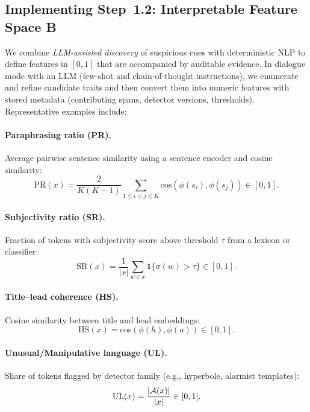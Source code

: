 \documentclass[ai,article,submit,pdftex,moreauthors]{Definitions/mdpi}
\begin{document}
\subsection{Implementing Step~1.2: Interpretable Feature Space B}\label{subsec:mlfeatures}
We combine \emph{LLM-assisted discovery} of suspicious cues with deterministic NLP to define features in $[0,1]$ that are accompanied by auditable evidence. In dialogue mode with an LLM (few-shot and chain-of-thought instructions), we enumerate and refine candidate traits and then convert them into numeric features with stored metadata (contributing spans, detector versions, thresholds). Representative examples include:

\paragraph{Paraphrasing ratio (PR).} Average pairwise sentence similarity using a sentence encoder and cosine similarity:
\begin{equation}
\mathrm{PR}(x)=\frac{2}{K(K-1)}\sum_{1\le i<j\le K}\mathrm{cos}\!\left(\phi(s_i),\phi(s_j)\right)\in[0,1].
\end{equation}

\paragraph{Subjectivity ratio (SR).} Fraction of tokens with subjectivity score above threshold $\tau$ from a lexicon or classifier:
\begin{equation}
\mathrm{SR}(x)=\frac{1}{|x|}\sum_{w\in x}\mathbb{1}\{\sigma(w)>\tau\}\in[0,1].
\end{equation}

\paragraph{Title--lead coherence (HS).} Cosine similarity between title and lead embeddings:
\begin{equation}
\mathrm{HS}(x)=\mathrm{cos}\!\left(\phi(h),\phi(a)\right)\in[0,1].
\end{equation}

\paragraph{Unusual/Manipulative language (UL).} Share of tokens flagged by detector family (e.g., hyperbole, alarmist templates):
\begin{equation}
\mathrm{UL}(x)=\frac{|{\cal A}(x)|}{|x|}\in[0,1].
\end{equation}
\end{document}
